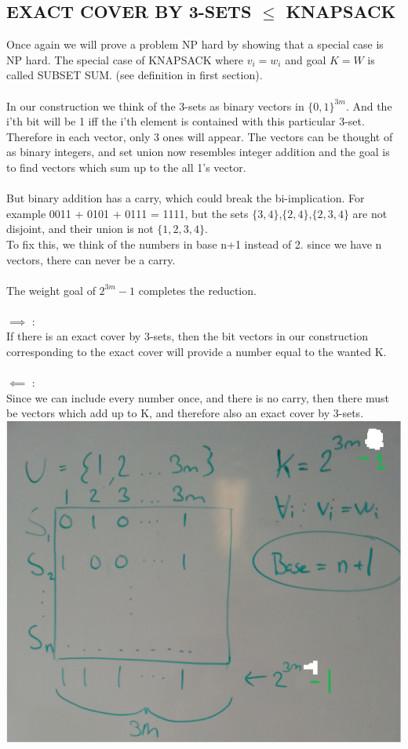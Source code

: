 \subsection{EXACT COVER BY 3-SETS $\le$ KNAPSACK}
Once again we will prove a problem NP hard by showing that a special case is NP hard. The special case of KNAPSACK where $v_i = w_i$ and goal $K = W$ is called SUBSET SUM. (see definition in first section).\\\\
In our construction we think of the 3-sets as binary vectors in $\{0,1\}^{3m}$. And the i'th bit will be 1 iff the i'th element is contained with this particular 3-set. Therefore in each vector, only 3 ones will appear. The vectors can be thought of as binary integers, and set union now resembles integer addition and the goal is to find vectors which sum up to the all 1's vector. \\\\
But binary addition has a carry, which could break the bi-implication. For example 0011 + 0101 + 0111 = 1111, but the sets $\{3,4\}$,$\{2,4\}$,$\{2,3,4\}$ are not disjoint, and their union is not $\{1,2,3,4\}$.\\
To fix this, we think of the numbers in base n+1 instead of 2. since we have n vectors, there can never be a carry.\\\\
The weight goal of $2^{3m}-1$ completes the reduction.\\\\
$\implies$ :\\ If there is an exact cover by 3-sets, then the bit vectors in our construction corresponding to the exact cover will provide a number equal to the wanted K.\\\\
$\impliedby$ :\\ Since we can include every number once, and there is no carry, then there must be vectors which add up to K, and therefore also an exact cover by 3-sets.
\includegraphics[scale=0.5]{knapsack}
\newpage


